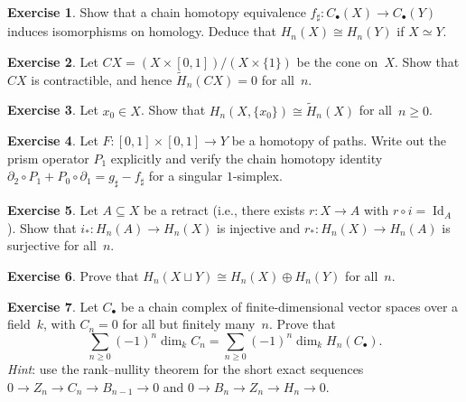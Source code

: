\documentclass[12pt,a4paper,openany]{book}
\theoremstyle{definition}
\newtheorem{exercise}{Exercise}[chapter]
\theoremstyle{plain}
\theoremstyle{remark}
\DeclareMathOperator{\Id}{Id}
\begin{document}
\begin{exercise}\label{exo:chain-homotopy-equivalence}
Show that a chain homotopy equivalence $f_\sharp\colon C_\bullet(X)\to
C_\bullet(Y)$ induces isomorphisms on homology.  Deduce that
$H_n(X)\cong H_n(Y)$ if $X\simeq Y$.
\end{exercise}

\begin{exercise}\label{exo:cone-acyclic}
Let $CX=(X\times[0,1])/(X\times\{1\})$ be the cone on~$X$.  Show that
$CX$ is contractible, and hence $\widetilde{H}_n(CX)=0$ for all~$n$.
\end{exercise}

\begin{exercise}\label{exo:relative-pair-point}
Let $x_0\in X$.  Show that $H_n(X,\{x_0\})\cong\widetilde{H}_n(X)$
for all~$n\ge 0$.
\end{exercise}

\begin{exercise}\label{exo:prism-explicit}
Let $F\colon [0,1]\times[0,1]\to Y$ be a homotopy of paths.  Write out the
prism operator $P_1$ explicitly and verify the chain homotopy identity
$\partial_2\circ P_1+P_0\circ\partial_1=g_\sharp-f_\sharp$
for a singular $1$-simplex.
\end{exercise}

\begin{exercise}\label{exo:retract-homology}
Let $A\subseteq X$ be a retract (i.e., there exists $r\colon X\to A$
with $r\circ i=\Id_A$).  Show that $i_*\colon H_n(A)\to H_n(X)$ is
injective and $r_*\colon H_n(X)\to H_n(A)$ is surjective for all~$n$.
\end{exercise}

\begin{exercise}\label{exo:homology-disjoint-union}
Prove that $H_n(X\sqcup Y)\cong H_n(X)\oplus H_n(Y)$ for all~$n$.
\end{exercise}

\begin{exercise}\label{exo:euler-char-chain}
Let $C_\bullet$ be a chain complex of finite-dimensional vector spaces
over a field~$k$, with $C_n=0$ for all but finitely many~$n$.  Prove that
\[
  \sum_{n\ge 0}(-1)^n\dim_k C_n
  = \sum_{n\ge 0}(-1)^n\dim_k H_n(C_\bullet).
\]
\textit{Hint}: use the rank--nullity theorem for the short exact sequences
$0\to Z_n\to C_n\to B_{n-1}\to 0$ and $0\to B_n\to Z_n\to H_n\to 0$.
\end{exercise}
\end{document}

